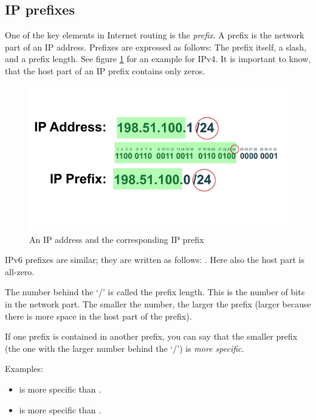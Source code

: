 \subsection{IP prefixes}
One of the key elements in Internet routing is the \emph{prefix}. A prefix is
the network part of an IP address. Prefixes are expressed as follows: The prefix itself, a
slash, and a prefix length. See figure \ref{fig:prefix} for an example for IPv4.
It is important to know, that the host part of an IP prefix contains only zeros.
\begin{figure}
  \centering
  \includegraphics[width=\linewidth,page=1]{img/Drawings.pdf}
  \caption{An IP address and the corresponding IP prefix}
  \label{fig:prefix}
\end{figure}

IPv6 prefixes are similar; they are written as follows: .
Here also the host part is all-zero.

The number behind the `/' is called the prefix length. This is the number of bits
in the network part. The smaller the number, the larger the prefix (larger because
there is more space in the host part of the prefix).

If one prefix is contained in another prefix, you can say that the smaller
prefix (the one with the larger number behind the `/') is \emph{more specific}.

Examples:
\begin{itemize}
  \item {} is more specific than .
  \item {} is more specific than .
\end{itemize}

